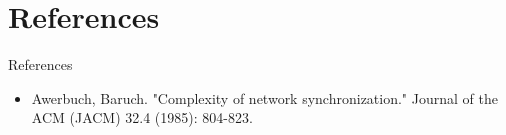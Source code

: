 \documentclass[11pt]{beamer}              %
\begin{document}
\section*{References}
\begin{frame}{References}
	
	
\tiny
\tiny
\begin{itemize}
	\item[\textbullet] Awerbuch, Baruch. "Complexity of network synchronization." Journal of the ACM (JACM) 32.4 (1985): 804-823.
\end{itemize}
\end{frame}




\thankslide
\end{document}
